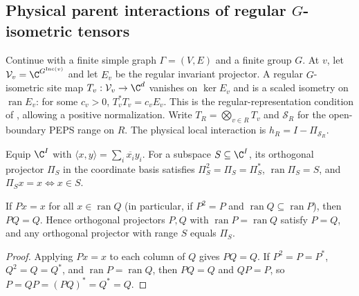 \subsection{Physical parent interactions of regular \texorpdfstring{$G$}{G}-isometric tensors}
\label{sec:peps_isometric_regional_parents}

Continue with a finite simple graph $\Gamma=(V,E)$ and a finite group $G$.
At $v$, let $\mathcal V_v=\C^{G^{\operatorname{Inc}(v)}}$ and let $E_v$
be the regular invariant projector. A regular $G$-isometric site map
$T_v:\mathcal V_v\to\C^d$ vanishes on $\ker E_v$ and is a scaled isometry
on $\operatorname{ran}E_v$: for some $c_v>0$,
$T_v^*T_v=c_vE_v$. This is the regular-representation condition of
\cite[Definition~6.1]{Schuch2010PEPS}, allowing a positive normalization.
Write $T_R=\bigotimes_{v\in R}T_v$ and
$\mathcal S_R$ for the open-boundary PEPS range on $R$.
The physical local interaction is $h_R=I-\Pi_{\mathcal S_R}$.

\begin{definition}%
    \label{def:peps_coordinate_projector}
    \leanok
    Equip $\C^I$ with $\langle x,y\rangle=\sum_i\overline{x_i}y_i$.
    For a subspace $S\subseteq\C^I$, its orthogonal projector $\Pi_S$ in the
    coordinate basis satisfies $\Pi_S^2=\Pi_S=\Pi_S^*$,
    $\operatorname{ran}\Pi_S=S$, and $\Pi_Sx=x\iff x\in S$.
\end{definition}

\begin{lemma}%
    \label{thm:peps_projection_range_unique}
    \leanok
    If $Px=x$ for all $x\in\operatorname{ran}Q$ (in particular, if $P^2=P$ and
    $\operatorname{ran}Q\subseteq\operatorname{ran}P$), then $PQ=Q$.
    Hence orthogonal projectors $P,Q$ with $\operatorname{ran}P=\operatorname{ran}Q$
    satisfy $P=Q$, and any orthogonal projector with range $S$ equals $\Pi_S$.
\end{lemma}
\begin{proof}\leanok
    Applying $Px=x$ to each column of $Q$ gives $PQ=Q$. If $P^2=P=P^*$,
    $Q^2=Q=Q^*$, and $\operatorname{ran}P=\operatorname{ran}Q$, then $PQ=Q$ and
    $QP=P$, so $P=QP=(PQ)^*=Q^*=Q$.
\end{proof}

